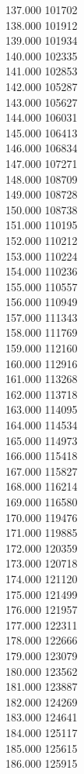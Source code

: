 { 137.000	101702 \\
 138.000	101912 \\
 139.000	101934 \\
 140.000	102335 \\
 141.000	102853 \\
 142.000	105287 \\
 143.000	105627 \\
 144.000	106031 \\
 145.000	106413 \\
 146.000	106834 \\
 147.000	107271 \\
 148.000	108709 \\
 149.000	108728 \\
 150.000	108738 \\
 151.000	110195 \\
 152.000	110212 \\
 153.000	110224 \\
 154.000	110236 \\
 155.000	110557 \\
 156.000	110949 \\
 157.000	111343 \\
 158.000	111769 \\
 159.000	112160 \\
 160.000	112916 \\
 161.000	113268 \\
 162.000	113718 \\
 163.000	114095 \\
 164.000	114534 \\
 165.000	114973 \\
 166.000	115418 \\
 167.000	115827 \\
 168.000	116214 \\
 169.000	116580 \\
 170.000	119476 \\
 171.000	119885 \\
 172.000	120359 \\
 173.000	120718 \\
 174.000	121120 \\
 175.000	121499 \\
 176.000	121957 \\
 177.000	122311 \\
 178.000	122666 \\
 179.000	123079 \\
 180.000	123562 \\
 181.000	123887 \\
 182.000	124269 \\
 183.000	124641 \\
 184.000	125117 \\
 185.000	125615 \\
 186.000	125915 \\
}
